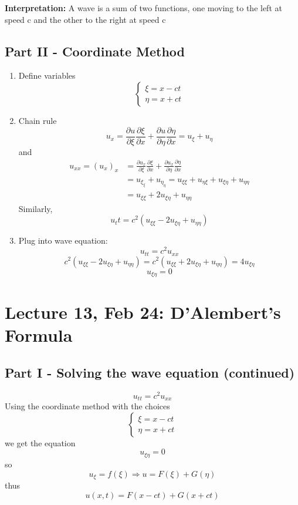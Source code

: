 \documentclass[12pt]{article}
\begin{document}
\textbf{Interpretation:} A wave is a sum of two functions, one moving to the left at speed c and the other to the right at speed c 

\subsection*{Part II - Coordinate Method}
\begin{enumerate}
    \item Define variables 
    \[\begin{cases}
        \xi  =x - ct \\
        \eta = x + ct
    \end{cases}\]
    \item Chain rule 
    \[u_x = \frac{\partial u}{\partial \xi} \frac{\partial \xi}{\partial x} + \frac{\partial u}{\partial \eta} \frac{\partial \eta}{\partial x} = u_\xi + u_\eta\]
    and 
    \begin{align*}
        u_{xx} = (u_x)_x &= \frac{\partial u_x}{\partial \xi} \frac{\partial \xi}{\partial x} + \frac{\partial u_x}{\partial \eta} \frac{\partial \eta}{\partial x} \\
        &= u_{\xi_\xi} + u_{\eta_\eta} = u_{\xi \xi} + u_{\eta \xi} + u_{\xi \eta} + u_{\eta \eta}\\
        &= u_{\xi \xi} + 2u_{\xi \eta} + u_{\eta \eta}
    \end{align*}
    Similarly, 
    \[u_tt = c^2 (u_{\xi \xi} - 2u_{\xi \eta} + u_{\eta \eta})\]

    \item Plug into wave equation:
    \[u_{tt} = c^2 u_{xx}\]
    \[c^2 (u_{\xi \xi} - 2u_{\xi \eta} + u_{\eta \eta}) = c^2( u_{\xi \xi} + 2u_{\xi \eta} + u_{\eta \eta}) = 4u_{\xi \eta}\]
    \[\boxed{u_{\xi \eta} = 0}\]
\end{enumerate}

\section*{Lecture 13, Feb 24: D'Alembert's Formula}
\subsection*{Part I - Solving the wave equation (continued)}
\[u_{tt} = c^2 u_{xx}\]
Using the coordinate method with the choices 
\[\begin{cases}
    \xi = x - ct\\
    \eta = x + ct
\end{cases}\]
we get the equation 
\[u_{\xi \eta} = 0\]
so
\[u_\xi = f(\xi) \Longrightarrow u = F(\xi) + G(\eta)\]
thus 
\[\boxed{u(x, t) = F(x - ct) + G(x + ct)}\]
\end{document}
